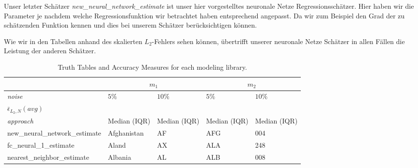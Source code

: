 Unser letzter Schätzer \textit{new\_neural\_network\_estimate} ist unser hier vorgestelltes neuronale Netze Regressionsschätzer. Hier haben wir die Parameter je nachdem welche Regressionsfunktion wir betrachtet haben entsprechend angepasst. Da wir zum Beispiel den Grad der zu schätzenden Funktion kennen und dies bei unserem Schätzer berücksichtigen können.
%


Wie wir in den Tabellen anhand des skalierten $L_2$-Fehlers sehen können, übertrifft unserer neuronale Netze Schätzer in allen Fällen die Leistung der anderen Schätzer. 

\begin{table}
\centering
\begin{tabular}{ |p{5cm}||p{2cm}|p{2cm}|p{2cm}|p{2cm}|  }
 \hline
 & \multicolumn{2}{|c|}{$m_1$} & \multicolumn{2}{|c|}{$m_2$}\\
 \hline
 \textit{noise}& $5\%$ & $10\%$ & $5\%$ & $10\%$ \\
 \hline
 $\bar{\epsilon}_{L_2,N}(avg)$&  &  &  &  \\
 \hline
 \textit{approach}& \footnotesize Median (IQR) & \footnotesize Median (IQR)  & \footnotesize Median (IQR)  & \footnotesize Median (IQR)  \\
 \hline
 new\_neural\_network\_estimate & Afghanistan   & AF    &AFG&   004\\
 fc\_neural\_1\_estimate & Aland &   AX  & ALA   &248\\
 nearest\_neighbor\_estimate & Albania &AL & ALB&  008\\
 \hline
\end{tabular}
    \caption{Truth Tables and Accuracy Measures for each modeling library.}
    \label{tab:truthTables}   
\end{table}
